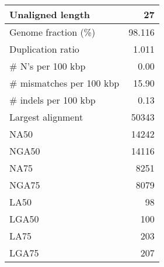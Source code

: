 \documentclass[12pt,a4paper]{article}
\begin{document}
\begin{table}[ht]
\begin{center}
\begin{tabular}{|l*{1}{|r}|}
Unaligned length & 27 \\ \hline
Genome fraction (\%) & 98.116 \\ \hline
Duplication ratio & 1.011 \\ \hline
\# N's per 100 kbp & 0.00 \\ \hline
\# mismatches per 100 kbp & 15.90 \\ \hline
\# indels per 100 kbp & 0.13 \\ \hline
Largest alignment & 50343 \\ \hline
NA50 & 14242 \\ \hline
NGA50 & 14116 \\ \hline
NA75 & 8251 \\ \hline
NGA75 & 8079 \\ \hline
LA50 & 98 \\ \hline
LGA50 & 100 \\ \hline
LA75 & 203 \\ \hline
LGA75 & 207 \\ \hline
\end{tabular}
\end{center}
\end{table}
\end{document}

